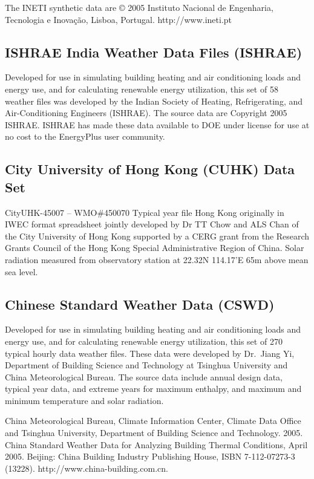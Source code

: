 The INETI synthetic data are © 2005 Instituto Nacional de Engenharia, Tecnologia e Inovação, Lisboa, Portugal. http://www.ineti.pt

\subsection{ISHRAE India Weather Data Files (ISHRAE)}\label{ishrae-india-weather-data-files-ishrae}

Developed for use in simulating building heating and air conditioning loads and energy use, and for calculating renewable energy utilization, this set of 58 weather files was developed by the Indian Society of Heating, Refrigerating, and Air-Conditioning Engineers (ISHRAE). The source data are Copyright 2005 ISHRAE. ISHRAE has made these data available to DOE under license for use at no cost to the EnergyPlus user community.

\subsection{City University of Hong Kong (CUHK) Data Set}\label{city-university-of-hong-kong-cuhk-data-set}

CityUHK-45007 -- WMO\#450070 Typical year file Hong Kong originally in IWEC format spreadsheet jointly developed by Dr TT Chow and ALS Chan of the City University of Hong Kong supported by a CERG grant from the Research Grants Council of the Hong Kong Special Administrative Region of China. Solar radiation measured from observatory station at 22.32N 114.17'E 65m above mean sea level.

\subsection{Chinese Standard Weather Data (CSWD)}\label{chinese-standard-weather-data-cswd}

Developed for use in simulating building heating and air conditioning loads and energy use, and for calculating renewable energy utilization, this set of 270 typical hourly data weather files. These data were developed by Dr.~Jiang Yi, Department of Building Science and Technology at Tsinghua University and China Meteorological Bureau. The source data include annual design data, typical year data, and extreme years for maximum enthalpy, and maximum and minimum temperature and solar radiation.

China Meteorological Bureau, Climate Information Center, Climate Data Office and Tsinghua University, Department of Building Science and Technology. 2005. China Standard Weather Data for Analyzing Building Thermal Conditions, April 2005. Beijing: China Building Industry Publishing House, ISBN 7-112-07273-3 (13228). http://www.china-building.com.cn.

